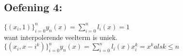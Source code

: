 \documentclass[../Oefenzitting4.tex]{subfiles}
\begin{document}
  \subsection{Oefening 4:}

  $
    \{ (x_{i}, 1) \}_{i=0}^{n}
    y_{n}(x) = \sum_{i=0}^{n} l_{i}(x) = 1
  $
    \\ want interpolerende veelterm is uniek.
  $
    \{ (x_{i}, x-{i}^{k}) \}_{i=0}^{n}
    y_{n}(x) = \sum_{i=0}^{n} l_{i}(x)x_{i}^{k} = x^{k} als k \leq n
  $
\end{document}
